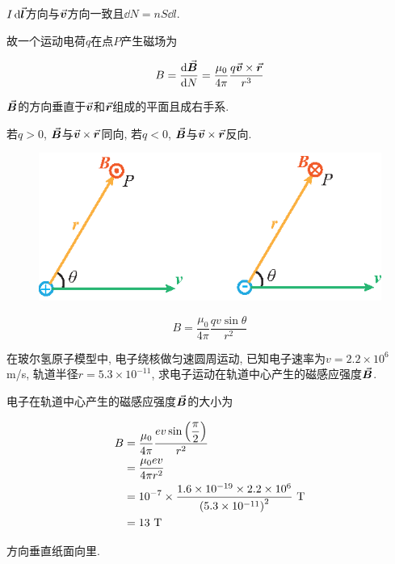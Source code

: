 $I\dd{\va*{l}}$方向与$\va*{v}$方向一致且$\dd{N} = nS\dd{l}$. 

故一个运动电荷$q$在点$P$产生磁场为

\begin{equation}
	B = \dv{\va*{B}}{N} = \dfrac{\mu_0}{4 \pi} \dfrac{q \va*{v} \times \va*{r}}{r^3} \label{C8-eq14}
\end{equation}

$\va*{B}$的方向垂直于$\va*{v}$和$\va*{r}$组成的平面且成右手系. 

若$q > 0$, $\va*{B}$与$\va*{v} \times \va*{r}$同向, 若$q < 0$, $\va*{B}$与$\va*{v} \times \va*{r}$反向. 

\begin{figure}[H]
	\centering
	\includegraphics[scale=1.0]{C8-fig7.eps}
\end{figure}

\begin{equation*}
	B = \dfrac{\mu_0}{4 \pi} \dfrac{q v \sin\theta}{r^2}
\end{equation*}

\begin{example}
	在玻尔氢原子模型中, 电子绕核做匀速圆周运动, 已知电子速率为$v = 2.2 \times 10^6$ m/s, 轨道半径$r = 5.3 \times 10^{-11}$, 求电子运动在轨道中心产生的磁感应强度$\va*{B}$. 
	
	\begin{solution}
		
		电子在轨道中心产生的磁感应强度$\va*{B}$的大小为
		
		\begin{align*}
			B &= \dfrac{\mu_0}{4 \pi} \dfrac{e v \sin\qty(\dfrac{\pi}{2})}{r^2} \\ 
			&= \dfrac{\mu_0 e v}{4 \pi r^2} \\
			&= 10^{-7} \times \dfrac{1.6 \times 10^{-19} \times 2.2 \times 10^6}{\qty(5.3 \times 10^{-11})^2} \textrm{~T} \\
			&= 13 \textrm{~T}
		\end{align*}
		
		方向垂直纸面向里. 
		
	\end{solution}
	
\end{example}

